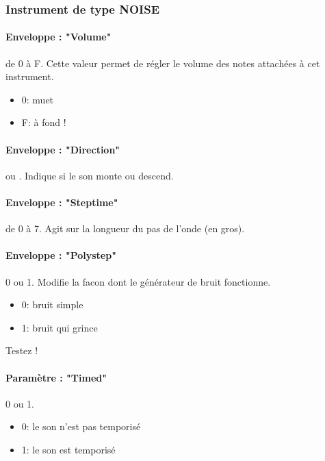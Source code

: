 \documentclass[12pt,a4paper]{article}
\begin{document}
        \subsubsection{Instrument de type NOISE}
        
        
        \paragraph{Enveloppe : "Volume"} de 0 à F. Cette valeur permet de régler le volume des notes attachées à cet instrument. 
            \begin{itemize}
                \item{0: muet}
                \item{F: à fond !}
            \end{itemize}
        
        \paragraph{Enveloppe : "Direction"}  ou .
            Indique si le son monte ou descend.
        
        \paragraph{Enveloppe : "Steptime"} de 0 à 7. Agit sur la longueur du pas de l'onde (en gros). 
        
        \paragraph{Enveloppe : "Polystep"} 0 ou 1. Modifie la facon dont le générateur de bruit fonctionne. 
        \begin{itemize}
            \item{0: bruit simple}
            \item{1: bruit qui grince}
        \end{itemize}
        Testez !
        
        \paragraph{Paramètre : "Timed"} 0 ou 1.
        \begin{itemize}
                \item{0: le son n'est pas temporisé}
                \item{1: le son est temporisé}
            \end{itemize} 
        
\end{document}
